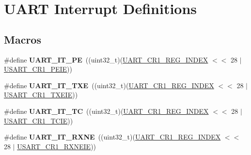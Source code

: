 \hypertarget{group___u_a_r_t___interrupt__definition}{}\section{U\+A\+RT Interrupt Definitions}
\label{group___u_a_r_t___interrupt__definition}
\subsection*{Macros}
\begin{DoxyCompactItemize}
\item 
\#define {\bfseries U\+A\+R\+T\+\_\+\+I\+T\+\_\+\+PE}~((uint32\+\_\+t)(\hyperlink{group___u_a_r_t___private___constants_ga5917bcb19b2dab202b8cbfa82520b93e}{U\+A\+R\+T\+\_\+\+C\+R1\+\_\+\+R\+E\+G\+\_\+\+I\+N\+D\+EX} $<$$<$ 28 $\vert$ \hyperlink{group___peripheral___registers___bits___definition_ga27405d413b6d355ccdb076d52fef6875}{U\+S\+A\+R\+T\+\_\+\+C\+R1\+\_\+\+P\+E\+IE}))\hypertarget{group___u_a_r_t___interrupt__definition_ga55f922ddcf513509710ade5d7c40a1db}{}\label{group___u_a_r_t___interrupt__definition_ga55f922ddcf513509710ade5d7c40a1db}

\item 
\#define {\bfseries U\+A\+R\+T\+\_\+\+I\+T\+\_\+\+T\+XE}~((uint32\+\_\+t)(\hyperlink{group___u_a_r_t___private___constants_ga5917bcb19b2dab202b8cbfa82520b93e}{U\+A\+R\+T\+\_\+\+C\+R1\+\_\+\+R\+E\+G\+\_\+\+I\+N\+D\+EX} $<$$<$ 28 $\vert$ \hyperlink{group___peripheral___registers___bits___definition_ga70422871d15f974b464365e7fe1877e9}{U\+S\+A\+R\+T\+\_\+\+C\+R1\+\_\+\+T\+X\+E\+IE}))\hypertarget{group___u_a_r_t___interrupt__definition_ga552636e2af516d578856f5ee2ba71ed7}{}\label{group___u_a_r_t___interrupt__definition_ga552636e2af516d578856f5ee2ba71ed7}

\item 
\#define {\bfseries U\+A\+R\+T\+\_\+\+I\+T\+\_\+\+TC}~((uint32\+\_\+t)(\hyperlink{group___u_a_r_t___private___constants_ga5917bcb19b2dab202b8cbfa82520b93e}{U\+A\+R\+T\+\_\+\+C\+R1\+\_\+\+R\+E\+G\+\_\+\+I\+N\+D\+EX} $<$$<$ 28 $\vert$ \hyperlink{group___peripheral___registers___bits___definition_gaa17130690a1ca95b972429eb64d4254e}{U\+S\+A\+R\+T\+\_\+\+C\+R1\+\_\+\+T\+C\+IE}))\hypertarget{group___u_a_r_t___interrupt__definition_gab9a4dc4e8cea354fd60f4117513b2004}{}\label{group___u_a_r_t___interrupt__definition_gab9a4dc4e8cea354fd60f4117513b2004}

\item 
\#define {\bfseries U\+A\+R\+T\+\_\+\+I\+T\+\_\+\+R\+X\+NE}~((uint32\+\_\+t)(\hyperlink{group___u_a_r_t___private___constants_ga5917bcb19b2dab202b8cbfa82520b93e}{U\+A\+R\+T\+\_\+\+C\+R1\+\_\+\+R\+E\+G\+\_\+\+I\+N\+D\+EX} $<$$<$ 28 $\vert$ \hyperlink{group___peripheral___registers___bits___definition_ga91118f867adfdb2e805beea86666de04}{U\+S\+A\+R\+T\+\_\+\+C\+R1\+\_\+\+R\+X\+N\+E\+IE}))\hypertarget{group___u_a_r_t___interrupt__definition_gac1bedf7a65eb8c3f3c4b52bdb24b139d}{}\label{group___u_a_r_t___interrupt__definition_gac1bedf7a65eb8c3f3c4b52bdb24b139d}


\end{DoxyCompactItemize}
